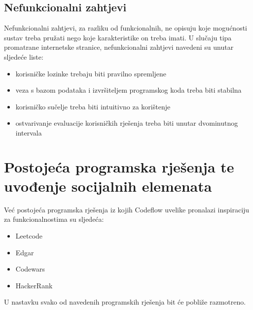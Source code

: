 \documentclass[times, utf8, zavrsni]{fer}
\begin{document}
		\section{Nefunkcionalni zahtjevi}
		Nefunkcionalni zahtjevi, za razliku od funkcionalnih, ne opisuju koje mogućnosti sustav treba pružati nego koje karakteristike on treba imati. U slučaju tipa promatrane internetske stranice, nefunkcionalni zahtjevi navedeni su unutar sljedeće liste:
		\begin{itemize}
			\item korisničke lozinke trebaju biti pravilno spremljene
			\item veza s bazom podataka i izvršiteljem programskog koda treba biti stabilna
			\item korisničko sučelje treba biti intuitivno za korištenje
			\item ostvarivanje evaluacije korisničkih rješenja treba biti unutar dvominutnog intervala 
		\end{itemize}
	
	\chapter{Postojeća programska rješenja te uvođenje socijalnih elemenata}
	Već postojeća programska rješenja iz kojih Codeflow uvelike pronalazi inspiraciju za funkcionalnostima su sljedeća:
	\begin{itemize}
		\item Leetcode
		\item Edgar
		\item Codewars
		\item HackerRank
	\end{itemize}
	U nastavku svako od navedenih programskih rješenja bit će pobliže razmotreno.
	
\end{document}
